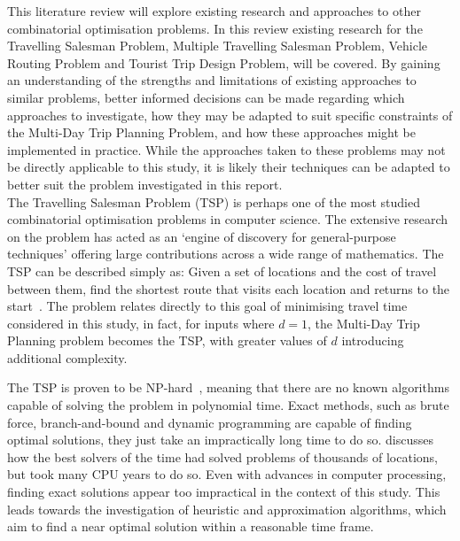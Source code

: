 This literature review will explore existing research and approaches to other combinatorial optimisation problems.
In this review existing research for the Travelling Salesman Problem, Multiple Travelling Salesman
Problem, Vehicle Routing Problem and Tourist Trip Design Problem, will be covered.
By gaining an understanding of the strengths and limitations of existing approaches to similar problems, better informed
decisions can be made regarding which approaches to investigate, how they may be adapted to suit specific constraints of
the Multi-Day Trip Planning Problem, and how these approaches might be implemented in practice.
While the approaches taken to these problems may not be directly applicable to this study, it is likely their
techniques can be adapted to better suit the problem investigated in this report.\\

\noindent
The Travelling Salesman Problem (TSP) is perhaps one of the most studied combinatorial optimisation problems in
computer science.
The extensive research on the problem has acted as an `engine of discovery for general-purpose techniques' offering
large contributions across a wide range of mathematics\parencite[p. 40--41]{applegate2006traveling}.
The TSP can be described simply as: Given a set of locations and the cost of travel between them, find the shortest
route that visits each location and returns to the start~\parencite[p. 1]{applegate2006traveling}.
The problem relates directly to this goal of minimising travel time considered in this study, in fact, for inputs where
$d = 1$, the Multi-Day Trip Planning problem becomes the TSP, with greater values of $d$ introducing additional
complexity.

The TSP is proven to be NP-hard~\parencite[p. 1096--1097]{cormen2022introduction}, meaning that there
are no known algorithms capable of solving the problem in polynomial time.
Exact methods, such as brute force, branch-and-bound and dynamic programming are capable of finding optimal
solutions, they just take an impractically long time to do so.
\textcite[p. 489--530]{applegate2006traveling} discusses how the best solvers of the time had solved problems of
thousands of locations, but took many CPU years to do so.
Even with advances in computer processing, finding exact solutions appear too impractical in the context of this study.
This leads towards the investigation of heuristic and approximation algorithms, which aim to find a near optimal
solution within a reasonable time frame.

